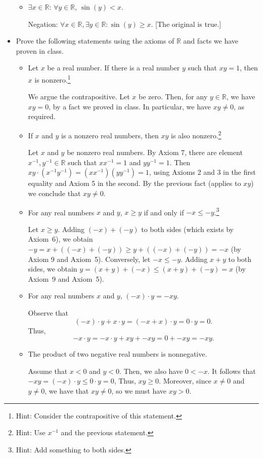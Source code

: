 \documentclass[12pt]{amsart}
\newcommand{\R}{{\mathbb{R}}}
\numberwithin{equation}{section}
\theoremstyle{plain} %
\theoremstyle{definition}
\theoremstyle{remark}
\begin{document}
\begin{itemize}
\begin{itemize}
		\item $\exists x\in \R$: $\forall y\in \R$, $\sin(y)<x$.\begin{framed}
			Negation: $\forall x\in \R,\exists y\in \R: \sin(y)\geq x$. [The original is true.]\end{framed}
	\end{itemize}

\item Prove the following statements using the axioms of $\R$ and facts we have proven in class.
\begin{itemize}
\item Let $x$ be a real number. If there is a real number $y$ such that $xy=1$, then $x$ is nonzero.\footnote{Hint: Consider the contrapositive of this statement.}
\begin{framed}
	We argue the contrapositive. Let $x$ be zero. Then, for any $y\in\R$, we have $xy=0$, by a fact we proved in class. In particular, we have $xy\neq 0$, as required.\end{framed}


\item If $x$ and $y$ is a nonzero real numbers, then $xy$ is also nonzero.\footnote{Hint: Use $x^{-1}$ and the previous statement.}

\begin{framed}
	Let $x$ and $y$ be nonzero real numbers. By Axiom 7, there are element $x^{-1},y^{-1}\in \R$ such that $x x^{-1}=1$ and $y y^{-1}=1$. Then $xy \cdot (x^{-1}y^{-1}) = (x x^{-1}) (y y^{-1}) =1$, using Axioms 2 and 3 in the first equality and Axiom 5 in the second. By the previous fact (applies to $xy$) we conclude that $xy\neq 0$.\end{framed}
	
	\item For any real numbers $x$ and $y$, $x\geq y$ if and only if $-{x \leq -y}$.\footnote{Hint: Add something to both sides.}
	\begin{framed}
		Let $x\geq y$. Adding $(-x) + (-y)$ to both sides (which exists by Axiom~6), we obtain $-y=x+((-x)+ (-y)) \geq y+((-x)+(-y)) = -x$ (by Axiom 9 and Axiom~5).
		Conversely, let $-x \leq -y$. Adding $x+y$ to both sides, we obtain $y=(x+y)+(-x) \leq (x+y)+(-y) = x$ (by Axiom~9 and Axiom~5).\end{framed} 

	\item For any real numbers $x$ and $y$, $(-x) \cdot y  = -xy$.
	\begin{framed}
		Observe that \[(-x) \cdot y + x\cdot y = (-x + x) \cdot y = 0 \cdot y = 0.\]
	Thus,
	\[ -x\cdot y = -x \cdot y + xy + -xy = 0 + -xy = -xy.\]
			\end{framed}
	\item The product of two negative real numbers is nonnegative.
	\begin{framed}
	Assume that $x<0$ and $y<0$. Then, we also have $0<-x$. It follows that $-xy = (-x) \cdot y \leq 0 \cdot y = 0$, Thus, $xy\geq 0$. Moreover, since $x\neq 0$ and $y\neq 0$, we have that $xy\neq 0$, so we must have $xy>0$.
	\end{framed}
\end{itemize}
	\end{itemize}
\end{document}
